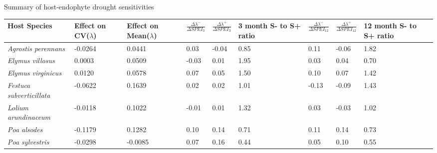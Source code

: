 \documentclass[12pt]{article}
\begin{document}
 Summary of host-endophyte drought sensitivities\\
\begin{table}[ht]
	\begin{adjustbox}{width=1\textwidth}{
			\begin{tabular}{|p{4cm}| p{2cm} |p{2cm}|p{2cm}|p{2cm}| p{2cm}|p{2cm}|p{2cm}|p{2cm}|}
				\hline
				\bf{Host Species} & \bf{Effect on CV($\lambda$)}& \bf{Effect on Mean($\lambda$)}&$\frac{\Delta\lambda^{-}}{\Delta SPEI_{3}}$ & $\frac{\Delta\lambda^{+}}{\Delta SPEI_{3}}$ &\bf{3 month S- to S+ ratio}&$\frac{\Delta\lambda^{-}}{\Delta SPEI_{12}}$ &$\frac{\Delta\lambda^{+}}{\Delta SPEI_{12}}$ &\bf{12 month S- to S+ ratio}\\
				\hline
				\emph{Agrostis perennans} &-0.0264&0.0441&0.03&-0.04&0.85&0.11&-0.06&1.82\\
				\emph{Elymus villosus} &0.0003&0.0509&-0.03&0.01&1.95&0.03&0.04&0.70\\
				\emph{Elymus virginicus} &0.0120&0.0578&0.07&0.05&1.50&0.10&0.07&1.42\\
				\emph{Festuca subverticillata} &-0.0622&0.1639&0.02&0.02&1.01&-0.13&-0.09&1.43\\
				\emph{Lolium arundinaceum} &-0.0118&0.1022&-0.01&0.01&1.32&0.03&-0.03&1.02\\
				\emph{Poa alsodes} &-0.1179&0.1282&0.10&0.14&0.71&0.11&0.14&0.73\\
				\emph{Poa sylvestris}&-0.0298&-0.0085&0.07&0.16&0.44&0.05&0.10&0.55\\
				\hline
		\end{tabular}}
	\end{adjustbox}
\end{table}
\end{document}
